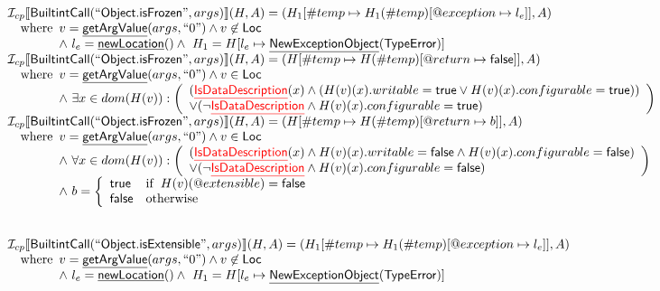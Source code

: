 \documentclass{article}
\makeatletter
\newcommand{\SF}[1]{\mbox{\textsf{#1}}}
\newcommand{\wherec}[1]{{\rm where}\begin{array}[t]{l}#1\end{array}}
\newcommand{\ifc}[1]{{\rm if}\begin{array}[t]{l}#1\end{array}}
\newcommand{\owc}{{\rm otherwise}}
\newcommand{\Loc}{\SF{Loc}}
\newcommand{\I}{\mathcal{I}}
\newcommand{\lbr}{\llbracket}
\newcommand{\rbr}{\rrbracket}
\newcommand{\hf}[1]{\underline{\sf #1}}
\newcommand{\varloc}[1]{\##1}
\newcommand{\varprop}[1]{@#1}
\def\inred{\color{red}}
\def\inred{\color{red}}
\makeatother
\begin{document}
\[\begin{array}{l}
\I _{cp}\lbr \SF{BuiltintCall}(``\SF{Object.isFrozen}",args)\rbr(H,A)
 = (H_1[\varloc{temp}\mapsto H_1(\varloc{temp})[\varprop{exception}\mapsto l_{e}]], A) \\
\quad\wherec{
  v = \hf{getArgValue}(args, ``0") \land v\not\in\Loc\\
  \land\ l_e = \hf{newLocation}() \land\ H_1=H[l_e\mapsto\hf{NewExceptionObject}(\SF{TypeError})] }\\
  
\I _{cp}\lbr \SF{BuiltintCall}(``\SF{Object.isFrozen}",args)\rbr(H,A)
 = (H[\varloc{temp}\mapsto H(\varloc{temp})[\varprop{return}\mapsto \SF{false}]], A) \\
\quad\wherec{
  v = \hf{getArgValue}(args, ``0") \land v  \in\Loc\\
  \land\ \exists x \in dom(H(v)) :\left(
    \begin{array}{l}
      (\hf{\inred IsDataDescription}(x) \land (H(v)(x).writable = \SF{true} \lor H(v)(x).configurable = \SF{true}))\\
      \lor (\neg \hf{\inred IsDataDescription} \land H(v)(x).configurable = \SF{true})
    \end{array}\right)
  }\\
   
\I _{cp}\lbr \SF{BuiltintCall}(``\SF{Object.isFrozen}",args)\rbr(H,A)
 = (H[\varloc{temp}\mapsto H(\varloc{temp})[\varprop{return}\mapsto b]], A) \\
\quad\wherec{
  v = \hf{getArgValue}(args, ``0") \land v  \in\Loc\\
  \land\ \forall x \in dom(H(v)) :\left(
    \begin{array}{l}
      (\hf{\inred IsDataDescription}(x) \land H(v)(x).writable = \SF{false} \land H(v)(x).configurable = \SF{false})\\
      \lor (\neg \hf{\inred IsDataDescription} \land H(v)(x).configurable = \SF{false})
    \end{array}\right)\\
  \land\ b = \left\{
    \begin{array}{ll}
      \SF{true} & \ifc{H(v)(@extensible) = \SF{false}}\\
      \SF{false} & \owc
    \end{array}\right.
   }\\
\\\\

\I _{cp}\lbr \SF{BuiltintCall}(``\SF{Object.isExtensible}",args)\rbr(H,A)
 = (H_1[\varloc{temp}\mapsto H_1(\varloc{temp})[\varprop{exception}\mapsto l_{e}]], A) \\
\quad\wherec{
  v = \hf{getArgValue}(args, ``0") \land v\not\in\Loc\\
  \land\ l_e = \hf{newLocation}() \land\ H_1=H[l_e\mapsto\hf{NewExceptionObject}(\SF{TypeError})] }\\
  

\end{array}\]
\end{document}
